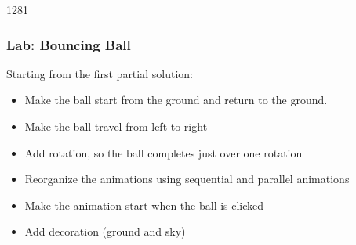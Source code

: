 \begin{slide}{1281}\frametitle{Lab: Bouncing Ball}


Starting from the first partial solution:

\begin{itemize}
\item Make the ball start from the ground and return to the ground.
\item Make the ball travel from left to right
\item Add rotation, so the ball completes just over one rotation
\item Reorganize the animations using sequential and parallel animations
\item Make the animation start when the ball is clicked
\item Add decoration (ground and sky)
\end{itemize}

\end{slide}
